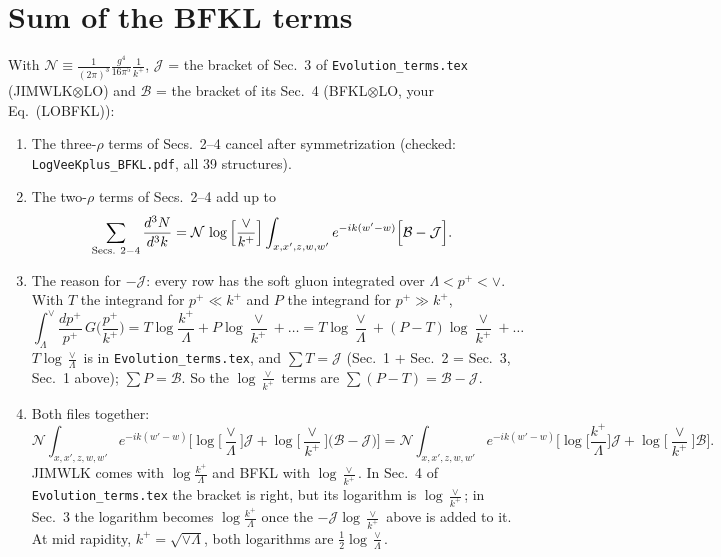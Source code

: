 \documentclass[9pt]{article}
\numberwithin{equation}{section}
\begin{document}
\section{Sum of the BFKL terms}\label{sec:sum}
With $\mathcal N\equiv\frac{1}{(2\pi)^{3}}\frac{g^{4}}{16\pi^{5}}\frac{1}{k^{+}}$, $\mathcal J$ = the bracket of Sec.~3 of \texttt{Evolution\_terms.tex} (JIMWLK$\otimes$LO) and $\mathcal B$ = the bracket of its Sec.~4 (BFKL$\otimes$LO, your Eq.~(LOBFKL)):
\begin{enumerate}
\item The three-$\rho$ terms of Secs.~2--4 cancel after symmetrization (checked: \texttt{LogVeeKplus\_BFKL.pdf}, all 39 structures).
\item The two-$\rho$ terms of Secs.~2--4 add up to
\begin{equation}
\sum_{\rm Secs.~2-4}\frac{d^3N}{d^3k}=\mathcal N\,\log\Big[\frac{\vee}{k^{+}}\Big]\int_{x,x',z,w,w'}e^{-ik(w'-w)}\Big[\mathcal B-\mathcal J\Big].
\end{equation}
\item The reason for $-\mathcal J$: every row has the soft gluon integrated over $\Lambda<p^+<\vee$. With $T$ the integrand for $p^+\ll k^+$ and $P$ the integrand for $p^+\gg k^+$,
\begin{equation*}
\int_\Lambda^\vee\frac{dp^+}{p^+}\,G\Big(\frac{p^+}{k^+}\Big)=T\log\frac{k^+}{\Lambda}+P\log\frac{\vee}{k^+}+\dots=T\log\frac{\vee}{\Lambda}+(P-T)\log\frac{\vee}{k^+}+\dots
\end{equation*}
$T\log\frac{\vee}{\Lambda}$ is in \texttt{Evolution\_terms.tex}, and $\sum T=\mathcal J$ (Sec.~1 + Sec.~2 = Sec.~3, Sec.~1 above); $\sum P=\mathcal B$. So the $\log\frac{\vee}{k^+}$ terms are $\sum(P-T)=\mathcal B-\mathcal J$.
\item Both files together:
\begin{equation}
\boxed{\mathcal N\int_{x,x',z,w,w'}e^{-ik(w'-w)}\Big[\log\Big[\frac{\vee}{\Lambda}\Big]\mathcal J+\log\Big[\frac{\vee}{k^{+}}\Big]\big(\mathcal B-\mathcal J\big)\Big]=\mathcal N\int_{x,x',z,w,w'}e^{-ik(w'-w)}\Big[\log\Big[\frac{k^{+}}{\Lambda}\Big]\mathcal J+\log\Big[\frac{\vee}{k^{+}}\Big]\mathcal B\Big].}
\end{equation}
JIMWLK comes with $\log\frac{k^+}{\Lambda}$ and BFKL with $\log\frac{\vee}{k^+}$. In Sec.~4 of \texttt{Evolution\_terms.tex} the bracket is right, but its logarithm is $\log\frac{\vee}{k^+}$; in Sec.~3 the logarithm becomes $\log\frac{k^+}{\Lambda}$ once the $-\mathcal J\log\frac{\vee}{k^+}$ above is added to it. At mid rapidity, $k^+=\sqrt{\vee\Lambda}$, both logarithms are $\frac12\log\frac{\vee}{\Lambda}$.
\end{enumerate}
\end{document}
